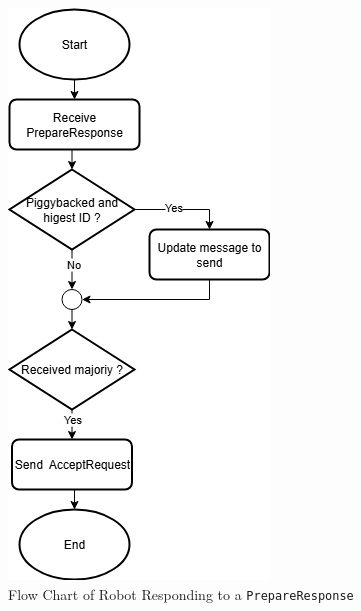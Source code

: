 \documentclass[12pt,a4paper]{article}
\begin{document}
\begin{itemize}
\begin{figure}
    \centering
    \includegraphics[width=0.5\linewidth]{images/prepare_response.png}
    \caption{Flow Chart of Robot Responding to a \texttt{PrepareResponse}}   
    \label{fig:prepare-response}
\end{figure}


\end{itemize}
\end{document}

